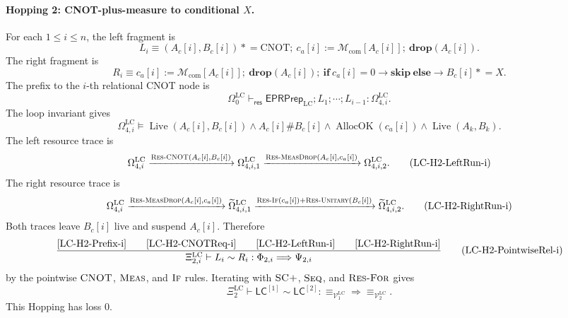 \documentclass{report}
\theoremstyle{defn_style}
\newcommand{\asteq}{\mathrel{*}=}
\providecommand{\Live}{\operatorname{Live}}
\providecommand{\AllocOK}{\operatorname{AllocOK}}
\providecommand{\HopLC}[1]{\mathsf{LC}^{[#1]}}
\begin{document}
\paragraph{Hopping 2: CNOT-plus-measure to conditional \(X\).}
For each \(1\le i\le n\), the left fragment is
\[
L_i
\equiv
(A_c[i],B_c[i])\asteq\mathrm{CNOT};
\ c_a[i]:=\mathcal M_{\mathrm{com}}[A_c[i]];
\ \mathbf{drop}(A_c[i]).
\]
The right fragment is
\[
R_i
\equiv
c_a[i]:=\mathcal M_{\mathrm{com}}[A_c[i]];
\ \mathbf{drop}(A_c[i]);
\ \mathbf{if}\ c_a[i]=0\rightarrow\mathbf{skip}
\ \mathbf{else}\rightarrow B_c[i]\asteq X .
\]
The prefix to the \(i\)-th relational CNOT node is
\[
\Omega^{\mathrm{LC}}_0
\vdash_{\mathsf{res}}
\mathsf{EPRPrep}_{\mathrm{LC}};
L_1;\cdots;L_{i-1}
:
\Omega^{\mathrm{LC}}_{4,i}.
\tag{LC-H2-Prefix-i}\label{LC-H2-Prefix-i}
\]
The loop invariant gives
\[
\Omega^{\mathrm{LC}}_{4,i}
\models
\Live(A_c[i],B_c[i])
\land
A_c[i]\#B_c[i]
\land
\AllocOK(c_a[i])
\land
\Live(A_k,B_k).
\tag{LC-H2-CNOTReq-i}\label{LC-H2-CNOTReq-i}
\]
The left resource trace is
\[
\Omega^{\mathrm{LC}}_{4,i}
\xrightarrow{\textsc{Res-CNOT}(A_c[i],B_c[i])}
\Omega^{\mathrm{LC}}_{4,i,1}
\xrightarrow{\textsc{Res-MeasDrop}(A_c[i],c_a[i])}
\Omega^{\mathrm{LC}}_{4,i,2}.
\tag{LC-H2-LeftRun-i}\label{LC-H2-LeftRun-i}
\]
The right resource trace is
\[
\Omega^{\mathrm{LC}}_{4,i}
\xrightarrow{\textsc{Res-MeasDrop}(A_c[i],c_a[i])}
\widetilde\Omega^{\mathrm{LC}}_{4,i,1}
\xrightarrow{\textsc{Res-If}(c_a[i])+\textsc{Res-Unitary}(B_c[i])}
\widetilde\Omega^{\mathrm{LC}}_{4,i,2}.
\tag{LC-H2-RightRun-i}\label{LC-H2-RightRun-i}
\]
Both traces leave \(B_c[i]\) live and suspend \(A_c[i]\).  Therefore
\[
\frac{
  \eqref{LC-H2-Prefix-i}
  \qquad
  \eqref{LC-H2-CNOTReq-i}
  \qquad
  \eqref{LC-H2-LeftRun-i}
  \qquad
  \eqref{LC-H2-RightRun-i}
}{
  \Xi^{\mathrm{LC}}_{2,i}
  \vdash
  L_i\sim R_i:
  \Phi_{2,i}\Longrightarrow\Psi_{2,i}
}
\tag{LC-H2-PointwiseRel-i}
\]
by the pointwise \(\textsc{CNOT}\), \(\textsc{Meas}\), and
\(\textsc{If}\) rules.  Iterating with \(\textsc{SC+}\), \(\textsc{Seq}\),
and \(\textsc{Res-For}\) gives
\[
\Xi^{\mathrm{LC}}_2
\vdash
\HopLC{1}\sim\HopLC{2}:
\equiv_{\mathcal V^{\mathrm{LC}}_1}
\Longrightarrow
\equiv_{\mathcal V^{\mathrm{LC}}_2}.
\tag{LC-H2-Rel}
\]
This Hopping has loss \(0\).
\end{document}
